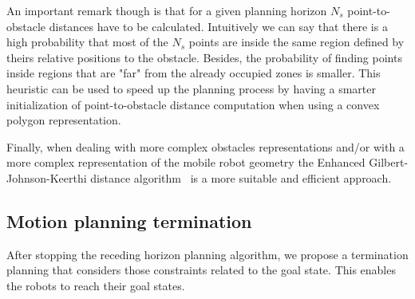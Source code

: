An important remark though is that for a given planning horizon $N_{s}$ point-to-obstacle distances have to be calculated. Intuitively we can say that there
is a high probability that most of the $N_{s}$ points are inside the same region defined by theirs relative positions to the obstacle.
Besides, the probability of finding points inside regions that are "far" from the already occupied zones is smaller.
This heuristic can be used to speed up the planning process by having a smarter initialization of point-to-obstacle distance computation when using a convex polygon representation.

Finally, when dealing with more complex obstacles representations and/or with a more complex representation of the mobile robot geometry the Enhanced Gilbert-Johnson-Keerthi distance algorithm~\cite{ericson2004real} is a more suitable and efficient approach.



\subsection{Motion planning termination}





After stopping the receding horizon planning algorithm, we propose a 
termination planning that considers those constraints related to
the goal state.
This enables the robots to reach their goal states.


